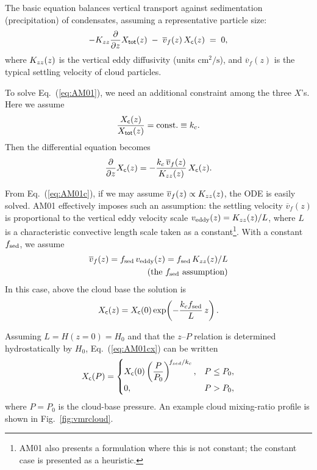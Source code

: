 The basic equation balances vertical transport against sedimentation (precipitation) of condensates, assuming a representative particle size:
\begin{align}
\label{eq:AM01}
- K_{zz} \frac{\partial}{\partial z} X_{\mathsf{tot}} (z) \;-\; \overline{v}_f (z)\, X_{\mathsf{c}} (z) \;=\; 0,
\end{align}
where $K_{zz}(z)$ is the vertical eddy diffusivity (units $\mathrm{cm^2/s}$), and $\overline{v}_f(z)$ is the typical settling velocity of cloud particles.

To solve Eq.~(\ref{eq:AM01}), we need an additional constraint among the three $X$’s.  
Here we assume
\begin{align}
\frac{X_{\mathsf{c}} (z)}{X_{\mathsf{tot}} (z)} = \mathrm{const.} \equiv k_c.
\end{align}
Then the differential equation becomes
\begin{align}
\label{eq:AM01c}
\frac{\partial}{\partial z} X_{\mathsf{c}} (z) = - \frac{ k_c \,\overline{v}_f (z)}{K_{zz}(z)} \, X_{\mathsf{c}} (z).
\end{align}

From Eq.~(\ref{eq:AM01c}), if we may assume $\overline{v}_f (z) \propto K_{zz}(z)$, the ODE is easily solved.  
AM01 effectively imposes such an assumption: the settling velocity $\overline{v}_f(z)$ is proportional to the vertical eddy velocity scale $v_\mathrm{eddy}(z)=K_{zz}(z)/L$, where $L$ is a characteristic convective length scale taken as a constant\footnote{AM01 also presents a formulation where this is not constant; the constant case is presented as a heuristic.}.  
With a constant $f_\mathrm{sed}$, we assume
\begin{align}
\overline{v}_f(z) = f_\mathrm{sed}\, v_\mathrm{eddy}(z) = f_\mathrm{sed}\, K_{zz}(z)/L \\
\qquad\text{(the $f_\mathrm{sed}$ assumption)} \nonumber
\end{align}
In this case, above the cloud base the solution is
\begin{align}
\label{eq:AM01cx}
X_{\mathsf{c}} (z) = X_{\mathsf{c}}(0) \exp\!\left( - \frac{ k_c f_\mathrm{sed}}{L} \, z \right).
\end{align}

Assuming $L=H(z{=}0)=H_0$ and that the $z$–$P$ relation is determined hydrostatically by $H_0$, Eq.~(\ref{eq:AM01cx}) can be written
\begin{align}
X_{\mathsf{c}}(P) = 
\begin{cases}
X_{\mathsf{c}}(0) \left( \dfrac{P}{P_0} \right)^{\! f_{sed}/k_c}, & P \le P_0, \\[4pt]
0, & P > P_0,
\end{cases}
\end{align}
where $P=P_0$ is the cloud-base pressure.  
An example cloud mixing-ratio profile is shown in Fig.~\ref{fig:vmrcloud}.

